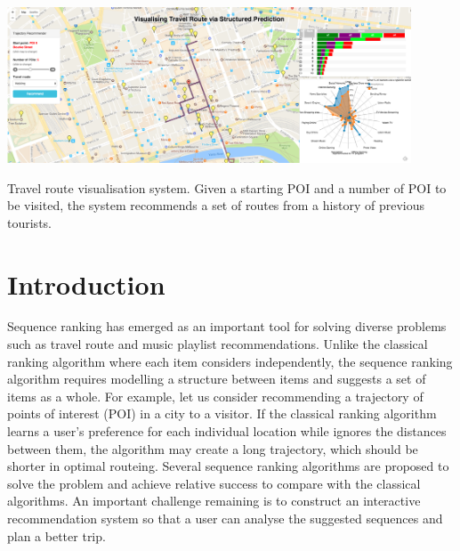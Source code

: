 \documentclass[sigconf]{acmart}
\begin{document}


 \begin{teaserfigure}
 \centering
   \includegraphics[width=0.9\textwidth]{figure/sample_map.png}
   \caption{Travel route visualisation system. Given a starting POI and a number of POI to be visited, the system recommends a set of routes from a history of previous tourists.}
   \label{fig:overview}
 \end{teaserfigure}

\maketitle


\section{Introduction}
Sequence ranking has emerged as an important tool for solving diverse problems such as travel route and music playlist recommendations. 
Unlike the classical ranking algorithm where each item considers independently, the sequence ranking algorithm requires modelling a structure between items and suggests a set of items as a whole. 
For example, let us consider recommending a trajectory of points of interest (POI) in a city to a visitor. 
If the classical ranking algorithm learns a user's preference for each individual location while ignores the distances between them, the algorithm may create a long trajectory, which should be shorter in optimal routeing. 
Several sequence ranking algorithms are proposed to solve the problem and achieve relative success to compare with the classical algorithms. 
An important challenge remaining is to construct an interactive recommendation system so that a user can analyse the suggested sequences and plan a better trip.
\end{document}
